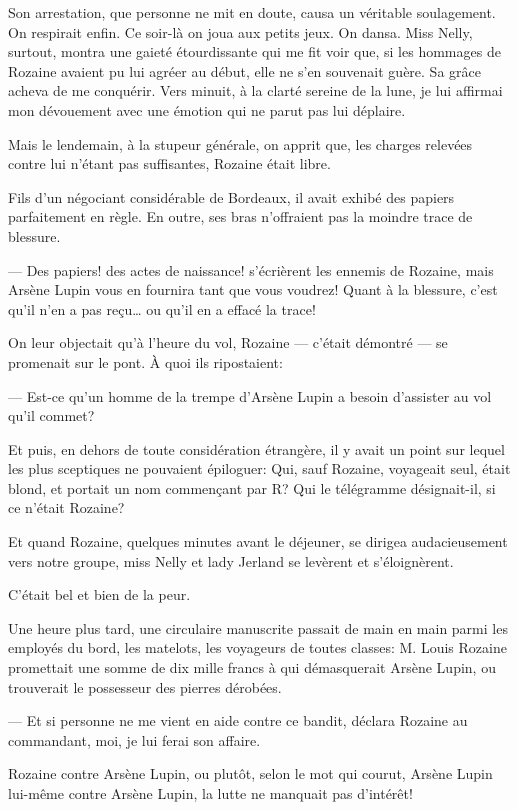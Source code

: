 \documentclass[12pt,a4paper]{article}
\begin{document}
Son arrestation, que personne ne mit en doute, causa un véritable soulagement. On respirait enfin. Ce soir-là on joua aux petits jeux. On dansa. Miss Nelly, surtout, montra une gaieté étourdissante qui me fit voir que, si les hommages de Rozaine avaient pu lui agréer au début, elle ne s’en souvenait guère. Sa grâce acheva de me conquérir. Vers minuit, à la clarté sereine de la lune, je lui affirmai mon dévouement avec une émotion qui ne parut pas lui déplaire.

Mais le lendemain, à la stupeur générale, on apprit que, les charges relevées contre lui n’étant pas suffisantes, Rozaine était libre.

Fils d’un négociant considérable de Bordeaux, il avait exhibé des papiers parfaitement en règle. En outre, ses bras n’offraient pas la moindre trace de blessure.

— Des papiers! des actes de naissance! s’écrièrent les ennemis de Rozaine, mais Arsène Lupin vous en fournira tant que vous voudrez! Quant à la blessure, c’est qu’il n’en a pas reçu… ou qu’il en a effacé la trace!

On leur objectait qu’à l’heure du vol, Rozaine — c’était démontré — se promenait sur le pont. À quoi ils ripostaient:

— Est-ce qu’un homme de la trempe d’Arsène Lupin a besoin d’assister au vol qu’il commet?

Et puis, en dehors de toute considération étrangère, il y avait un point sur lequel les plus sceptiques ne pouvaient épiloguer: Qui, sauf Rozaine, voyageait seul, était blond, et portait un nom commençant par R? Qui le télégramme désignait-il, si ce n’était Rozaine?

Et quand Rozaine, quelques minutes avant le déjeuner, se dirigea audacieusement vers notre groupe, miss Nelly et lady Jerland se levèrent et s’éloignèrent.

C’était bel et bien de la peur.

Une heure plus tard, une circulaire manuscrite passait de main en main parmi les employés du bord, les matelots, les voyageurs de toutes classes: M. Louis Rozaine promettait une somme de dix mille francs à qui démasquerait Arsène Lupin, ou trouverait le possesseur des pierres dérobées.

— Et si personne ne me vient en aide contre ce bandit, déclara Rozaine au commandant, moi, je lui ferai son affaire. 

Rozaine contre Arsène Lupin, ou plutôt, selon le mot qui courut, Arsène Lupin lui-même contre Arsène Lupin, la lutte ne manquait pas d’intérêt!
\end{document}
